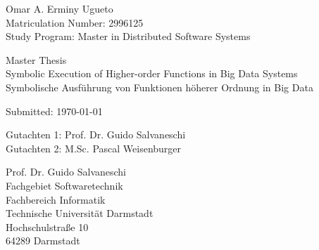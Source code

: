 \begin{tabular}{c}\end{tabular}
\vfill
Omar A. Erminy Ugueto\\
Matriculation Number: 2996125\\
Study Program: Master in Distributed Software Systems
 
Master Thesis\\
Symbolic Execution of Higher-order Functions in Big Data Systems \\
Symbolische Ausführung von Funktionen höherer Ordnung in Big Data

Submitted: \today

Gutachten 1: Prof. Dr. Guido Salvaneschi \\
Gutachten 2: M.Sc. Pascal Weisenburger 

Prof. Dr. Guido Salvaneschi\\
Fachgebiet Softwaretechnik \\
Fachbereich Informatik\\
Technische Universität Darmstadt\\
Hochschulstraße 10\\
64289 Darmstadt